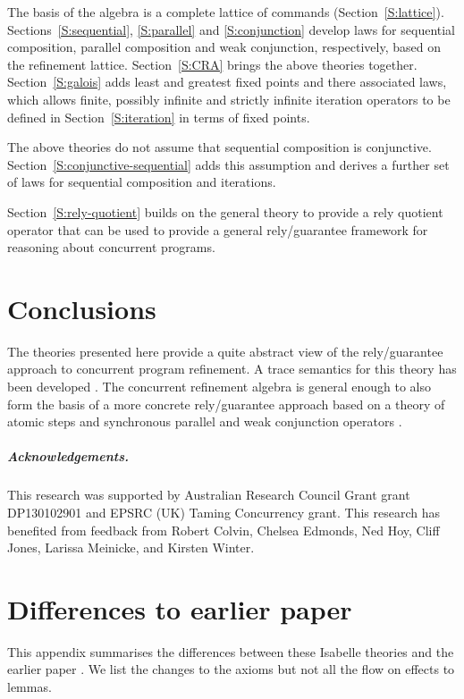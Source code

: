 \documentclass[12pt,a4paper]{article}
\begin{document}
The basis of the algebra is a complete lattice of commands (Section~\ref{S:lattice}).
Sections~\ref{S:sequential}, \ref{S:parallel} and \ref{S:conjunction} 
develop laws for sequential composition, parallel composition and weak conjunction,
respectively, based on the refinement lattice.
Section~\ref{S:CRA} brings the above theories together.
Section~\ref{S:galois} adds least and greatest fixed points and there associated laws,
which allows finite, possibly infinite and strictly infinite iteration operators to
be defined in Section~\ref{S:iteration} in terms of fixed points.

The above theories do not assume that sequential composition is conjunctive.
Section~\ref{S:conjunctive-sequential} adds this assumption and derives a further
set of laws for sequential composition and iterations.

Section~\ref{S:rely-quotient} builds on the general theory to provide a rely quotient
operator that can be used to provide a general rely/guarantee framework for 
reasoning about concurrent programs.



\section{Conclusions}

The theories presented here provide a quite abstract view of the rely/guarantee approach
to concurrent program refinement.
A trace semantics for this theory has been developed \cite{DaSMfaWSLwC}.
The concurrent refinement algebra is general enough to also form the basis of a
more concrete rely/guarantee approach based on a theory of atomic steps and
synchronous parallel and weak conjunction operators \cite{FM2016atomicSteps}.

\subparagraph*{Acknowledgements.}

This research was supported by
Australian Research Council Grant grant
DP130102901
and
EPSRC (UK) Taming Concurrency grant.
This research has benefited from feedback from
Robert Colvin,
Chelsea Edmonds,
Ned Hoy,
Cliff Jones,
Larissa Meinicke,
and
Kirsten Winter.

\appendix
\section{Differences to earlier paper}

This appendix summarises the differences between these Isabelle theories and
the earlier paper \cite{AFfGRGRACP}.
We list the changes to the axioms but not all the flow on effects to lemmas.
\end{document}
